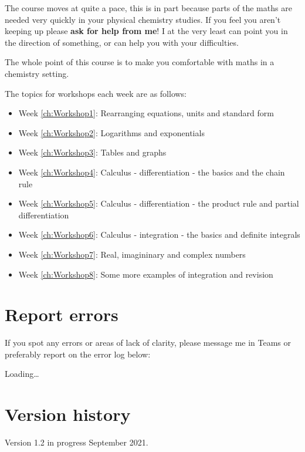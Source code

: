 \documentclass[
]{book}
\providecommand{\tightlist}{%
  \setlength{\itemsep}{0pt}\setlength{\parskip}{0pt}}
\begin{document}
The course moves at quite a pace, this is in part because parts of the maths are needed very quickly in your physical chemistry studies. If you feel you aren't keeping up please \textbf{ask for help from me}! I at the very least can point you in the direction of something, or can help you with your difficulties.

The whole point of this course is to make you comfortable with maths in a chemistry setting.

The topics for workshops each week are as follows:

\begin{itemize}
\tightlist
\item
  Week \ref{ch:Workshop1}: Rearranging equations, units and standard form
\item
  Week \ref{ch:Workshop2}: Logarithms and exponentials
\item
  Week \ref{ch:Workshop3}: Tables and graphs
\item
  Week \ref{ch:Workshop4}: Calculus - differentiation - the basics and the chain rule
\item
  Week \ref{ch:Workshop5}: Calculus - differentiation - the product rule and partial differentiation
\item
  Week \ref{ch:Workshop6}: Calculus - integration - the basics and definite integrals
\item
  Week \ref{ch:Workshop7}: Real, imagininary and complex numbers
\item
  Week \ref{ch:Workshop8}: Some more examples of integration and revision
\end{itemize}

\hypertarget{report-errors}{%
\section*{Report errors}\label{report-errors}}

If you spot any errors or areas of lack of clarity, please message me in Teams or preferably report on the error log below:

Loading\ldots{}

\hypertarget{version-history}{%
\section*{Version history}\label{version-history}}

Version 1.2 in progress September 2021.
\end{document}
